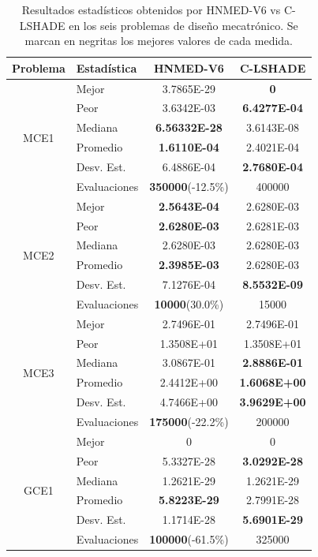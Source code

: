 \begin{table}
	\centering
	\captionsetup{width=.85\linewidth}
	\caption[Resultados estadísticos obtenidos por HNMED-V6 vs C-LSHADE
	en los seis problemas de diseño mecatrónico]{Resultados estadísticos obtenidos por HNMED-V6 vs C-LSHADE
		en los seis problemas de diseño mecatrónico. Se marcan en negritas los
		mejores valores de cada medida.} \label{tab:Resultados estadísticos obtenidos por variantes HNMED6 y CLSHADE  en experimento E.}
	\begin{tabular}{clcc} 
		\hline
		Problema              & Estadística   & HNMED-V6 & C-LSHADE  \\ 
		\hline
		\multirow{6}{*}{MCE1} & Mejor        & 3.7865E-29 &\textbf{ 0 }            \\
		& Peor         &3.6342E-03&  \textbf{6.4277E-04}
		\\
		& Mediana      &\textbf{6.56332E-28}&3.6143E-08            \\
		& Promedio     &\textbf{1.6110E-04}&  2.4021E-04             \\
		& Desv. Est.   &6.4886E-04& \textbf{2.7680E-04 }         \\
		& Evaluaciones &\textbf{350000}(-12.5\%)  &  400000       \\
		\hline
		
		\multirow{6}{*}{MCE2} & Mejor        &\textbf{2.5643E-04}&2.6280E-03
		\\
		& Peor         &\textbf{2.6280E-03}&2.6281E-03                \\
		& Mediana      &2.6280E-03&2.6280E-03   \\
		& Promedio     &\textbf{2.3985E-03}&2.6280E-03    \\
		& Desv. Est.   &7.1276E-04&\textbf{8.5532E-09} \\
		& Evaluaciones &\textbf{10000}(30.0\%) &15000                \\
		\hline
		
		\multirow{6}{*}{MCE3} & Mejor        &2.7496E-01&2.7496E-01  \\
		& Peor         &1.3508E+01&1.3508E+01     \\
		& Mediana      &3.0867E-01&\textbf{2.8886E-01} \\
		& Promedio     &2.4412E+00&\textbf{1.6068E+00}\\
		& Desv. Est.   &4.7466E+00&\textbf{3.9629E+00}\\
		& Evaluaciones &\textbf{175000}(-22.2\%)& 200000 \\
		\hline
		\multirow{6}{*}{GCE1} & Mejor        &0&0\\
		& Peor         &5.3327E-28&\textbf{3.0292E-28}\\
		& Mediana      &1.2621E-29&1.2621E-29\\
		& Promedio     &\textbf{5.8223E-29}&2.7991E-28 \\
		& Desv. Est.   &1.1714E-28&\textbf{5.6901E-29}\\
		& Evaluaciones &\textbf{100000}(-61.5\%)&325000 \\
		\hline
		

\end{tabular}
\end{table}
